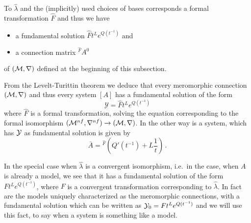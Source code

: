 To $\hat\lambda$ and the (implicitly) used choices of bases corresponds a
formal transformation $\hat F$ and thus we have
\begin{itemize}
  \item a fundamental solution $\hat Ft^L e^{Q(t^{-1})}$ and
  \item a connection matrix ${}^{\hat F}\!A^0$
\end{itemize}
of $(\mathcal{M},\nabla)$ defined at the beginning of this subsection.
\begin{cor}
  From the Levelt-Turittin theorem we deduce that every meromorphic connection
  $(\mathcal{M},\nabla)$ and thus every system $[A]$ has a fundamental solution of the
  form
  \[
    \mathcal{Y}=\hat F t^L e^{Q(t^{-1})}
  \]
  where $\hat F$ is a formal transformation, solving the equation corresponding
  to the formal isomorphism $(\mathcal{M}^{nf},\nabla^{nf})\to(\mathcal{M},\nabla)$.
  In the other way is a system, which has $\mathcal{Y}$ as fundamental solution is
  given by
  \[
    \bar A={}^{\hat F}\!\left(Q'(t^{-1})+L\frac{1}{t}\right) \,.
  \]
  \begin{comment}
    \begin{s-rem}
      It is always possible to permutate the columns of a fundamental solution
      by
      \[
        P^{-1}\mathcal{Y}P=\hat F t^{P^{-1}LP} e^{P^{-1}Q(t^{-1})P}
      \]
      with a permutation matrix $P$ and \rewrite{obtain another fundamental
      solution for the same system} (cf.\ \cite[73]{Loday2014}).
    \end{s-rem}
  \end{comment}
\end{cor}
In the special case when $\hat\lambda$ is a convergent isomorphism, i.e.\ in
the case, when $A$ is already a model, we see that it has a fundamental
solution of the form $Ft^L e^{Q(t^{-1})}$, where $F$ is a convergent
transformation corresponding to $\hat\lambda$.
In fact are the models uniquely characterized as the meromorphic connections,
with a fundamental solution which can be written as $\mathcal{Y}_0=Ft^Le^{Q(t^{-1})}$
and we will use this fact, to say when a system is something like a model.

